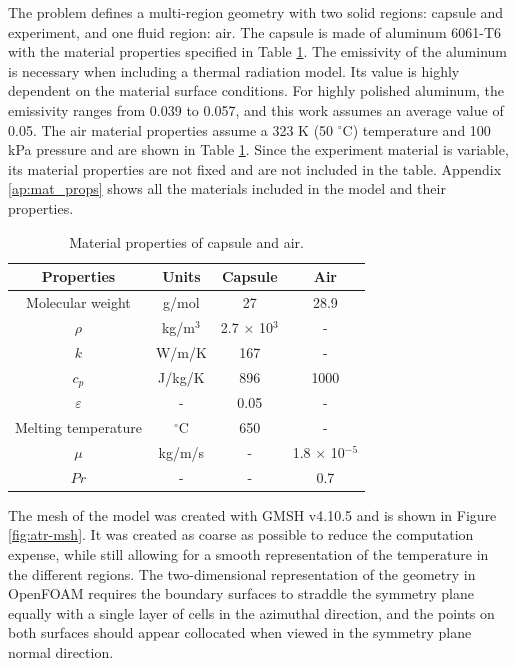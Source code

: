 The problem defines a multi-region geometry with two solid regions: capsule and experiment, and one fluid region: air.
The capsule is made of aluminum 6061-T6 \cite{inl_advanced_2009} with the material properties specified in Table \ref{tab:al-props}.
The emissivity of the aluminum is necessary when including a thermal radiation model.
Its value is highly dependent on the material surface conditions.
For highly polished aluminum, the emissivity ranges from 0.039 to 0.057, and this work assumes an average value of 0.05.
The air material properties assume a 323 K (50 $^\circ$C) temperature and 100 kPa pressure and are shown in Table \ref{tab:al-props}.
Since the experiment material is variable, its material properties are not fixed and are not included in the table.
Appendix \ref{ap:mat_props} shows all the materials included in the model and their properties.

\begin{table}[htbp!]
  \centering
  \caption{Material properties of capsule and air.}
  \label{tab:al-props}
  \begin{tabular}{cccc}
    \toprule
      Properties     & Units     & Capsule                & Air                    \\
    \midrule
      Molecular weight & g/mol   & 27                     & 28.9                   \\
      $\rho$         & kg/m$^3$  & 2.7 $\times$ 10$^{3}$  & -                      \\
      $k$            & W/m/K     & 167                    & -                      \\
      $c_p$          & J/kg/K    & 896                    & 1000                   \\
      $\varepsilon$  & -         & 0.05                   & -                      \\
      Melting temperature     & $^\circ$C & 650                    & -                      \\
      $\mu$          & kg/m/s    & -                      & 1.8 $\times$ 10$^{-5}$ \\
      $Pr$           & -         & -                      & 0.7                    \\
    \bottomrule
  \end{tabular}
\end{table}

The mesh of the model was created with GMSH v4.10.5\cite{geuzaine_gmsh_2009} and is shown in Figure \ref{fig:atr-msh}.
It was created as coarse as possible to reduce the computation expense, while still allowing for a smooth representation of the temperature in the different regions.
The two-dimensional representation of the geometry in OpenFOAM requires the boundary surfaces to straddle the symmetry plane equally with a single layer of cells in the azimuthal direction, and the points on both surfaces should appear collocated when viewed in the symmetry plane normal direction.

